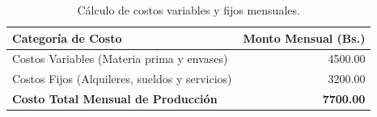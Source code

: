 \begin{table}[htbp]
    \centering
    \caption{Cálculo de costos variables y fijos mensuales.}
    \label{tab:costos_produccion}
    \begin{tabular}{lr}
        \toprule
        \textbf{Categoría de Costo} & \textbf{Monto Mensual (Bs.)} \\
        \midrule
        Costos Variables (Materia prima y envases) & 4500.00 \\
        Costos Fijos (Alquileres, sueldos y servicios) & 3200.00 \\
        \midrule
        \textbf{Costo Total Mensual de Producción} & \textbf{7700.00} \\
        \bottomrule
    \end{tabular}
\end{table}
